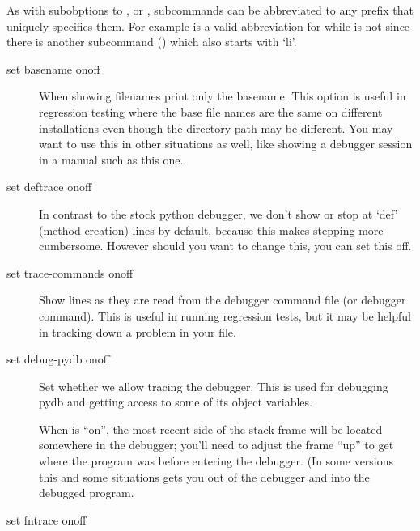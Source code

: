 As with subobptions to , or , 
subcommands can be abbreviated to any prefix that uniquely
specifies them. For example  is a valid abbreviation for
 while  is not since there is another
subcommand () which also starts with `li'.

\begin{description}

\item[set basename on\code{\Large{|}}off]\label{command:basename}

When showing filenames print only the basename. This option is useful
in regression testing where the base file names are the same
on different installations even though the directory path may
be different. You may want to use this in other
situations as well, like showing a debugger session in a manual
such as this one. 

\item[set deftrace on\code{\Large{|}}off]\label{command:deftrace}
 
In contrast to the stock python debugger, we don't show or stop at
`def' (method creation) lines by default, because this makes stepping more
cumbersome. However should you want to change this, you can set
this off.

\item[set trace-commands on\code{\Large{|}}off]\label{command:trace-commands}
 
Show lines as they are read from the debugger command file (or
 debugger command). This is useful in running
regression tests, but it may be helpful in tracking down a problem in
your  file.

\item[set debug-pydb on\code{\Large{|}}off]\label{command:debug-pydb}

Set whether we allow tracing the debugger. This is used for debugging
pydb and getting access to some of its object variables. 

When  is ``on'', the most recent side of the stack
frame will be located somewhere in the debugger; you'll need to adjust
the frame ``up'' to get where the program was before entering the
debugger. (In some versions this and some situations 
gets you out of the debugger and into the debugged program.

\item[set fntrace on\code{\Large{|}}off]\label{command:fntrace}


\end{description}
